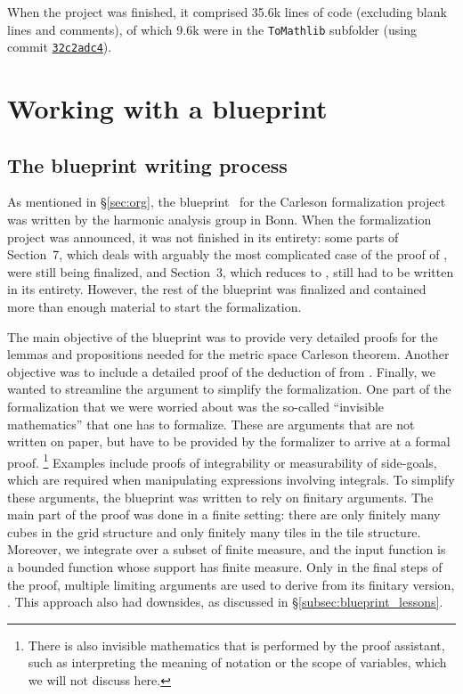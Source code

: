 \documentclass[12pt, reqno]{amsart}
\theoremstyle{definition}
\theoremstyle{plain}
\begin{document}
When the project was finished, it comprised 35.6k lines of code (excluding blank lines and comments), of which 9.6k were in the \texttt{ToMathlib} subfolder (using commit \texttt{\href{https://github.com/fpvandoorn/carleson/tree/32c2adc411c5c274ed8f19aa8041157e394fa38a}{32c2adc4}}).

\section{Working with a blueprint}\label{sec:blueprint}
\subsection{The blueprint writing process}\label{subsec:blueprint_writing}

As mentioned in \S\ref{sec:org}, the blueprint~\cite{CarlesonBlueprint} for the Carleson formalization project was written
by the harmonic analysis group in Bonn. When the formalization project was announced, it was not finished in its entirety: some parts of Section~7,
which deals with arguably the most complicated case of the proof of ,
were still being finalized, and
Section~3, which reduces  to ,
still had to be written in its entirety.
However, the rest of the blueprint was finalized
and contained more than enough material to start the formalization.

The main objective of the blueprint was to provide very detailed proofs for the lemmas and propositions
needed for the metric space Carleson theorem.
Another objective was to include a detailed proof
of the deduction of  from .
Finally, we wanted to streamline the argument to simplify the formalization.
One part of the formalization that we were worried about was the so-called ``invisible mathematics'' \cite{Bauer-2023} that one has to formalize.
These are arguments that are not written on paper,
but have to be provided by the formalizer to arrive at a formal proof.%
\footnote{There is also invisible mathematics that is performed by the proof assistant,
such as interpreting the meaning of notation or the scope of variables,
which we will not discuss here.}
Examples include proofs of integrability or measurability of side-goals, which are required
when manipulating expressions involving integrals.
To simplify these arguments, the blueprint was written to rely on finitary arguments.
The main part of the proof was done in a finite setting:
there are only finitely many cubes in the grid structure
and only finitely many tiles in the tile structure.
Moreover, we integrate over a subset of finite measure,
and the input function is a bounded function whose support has finite measure.
Only in the final steps of the proof,
multiple limiting arguments are used to derive 
from its finitary version, .
This approach also had downsides, as discussed in \S\ref{subsec:blueprint_lessons}.
\end{document}

